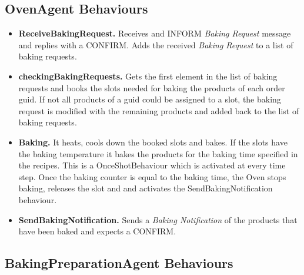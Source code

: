 \documentclass[paper=a4, fontsize=11pt]{scrartcl}
\begin{document}
	\subsection*{OvenAgent Behaviours}

	\begin{itemize}
		\item \textbf{ReceiveBakingRequest.} Receives and INFORM \textit{Baking Request} message and replies with a CONFIRM. Adds the received \textit{Baking Request} to a list of baking requests.

		\item \textbf{checkingBakingRequests.} Gets the first element in the list of baking requests and books the slots needed for baking the products of each order guid. If not all products of a guid could be assigned to a slot, the baking request is modified with the remaining products and added back to the list of baking requests.

		\item \textbf{Baking.} It heats, cools down the booked slots and bakes. If the slots have the baking temperature it bakes the products for the baking time specified in the recipes. This is a OnceShotBehaviour which is activated at every time step. Once the baking counter is equal to the baking time, the Oven stops baking, releases the slot and  and activates the SendBakingNotification behaviour.

		\item \textbf{SendBakingNotification.} Sends a \textit{Baking Notification} of the products that have been baked and expects a CONFIRM.

	\end{itemize}

		\subsection*{BakingPreparationAgent Behaviours}
\end{document}
